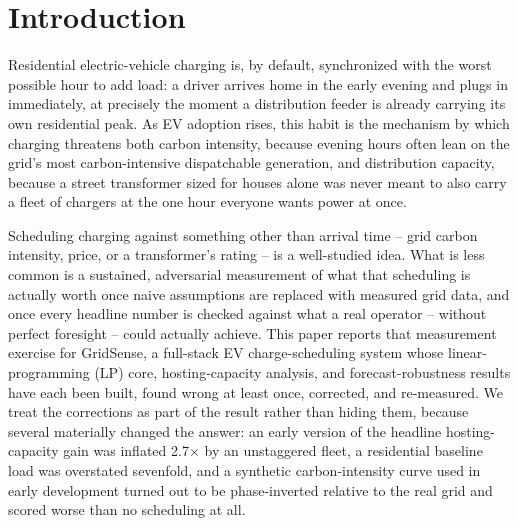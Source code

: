 \documentclass[journal]{IEEEtran}
\begin{document}
\section{Introduction}

Residential electric-vehicle charging is, by default, synchronized with the worst possible hour to add load: a driver arrives home in the early evening and plugs in immediately, at precisely the moment a distribution feeder is already carrying its own residential peak. As EV adoption rises, this habit is the mechanism by which charging threatens both carbon intensity, because evening hours often lean on the grid's most carbon-intensive dispatchable generation, and distribution capacity, because a street transformer sized for houses alone was never meant to also carry a fleet of chargers at the one hour everyone wants power at once.

Scheduling charging against something other than arrival time -- grid carbon intensity, price, or a transformer's rating -- is a well-studied idea. What is less common is a sustained, adversarial measurement of what that scheduling is actually worth once naive assumptions are replaced with measured grid data, and once every headline number is checked against what a real operator -- without perfect foresight -- could actually achieve. This paper reports that measurement exercise for GridSense, a full-stack EV charge-scheduling system whose linear-programming (LP) core, hosting-capacity analysis, and forecast-robustness results have each been built, found wrong at least once, corrected, and re-measured. We treat the corrections as part of the result rather than hiding them, because several materially changed the answer: an early version of the headline hosting-capacity gain was inflated 2.7$\times$ by an unstaggered fleet, a residential baseline load was overstated sevenfold, and a synthetic carbon-intensity curve used in early development turned out to be phase-inverted relative to the real grid and scored worse than no scheduling at all.
\end{document}

